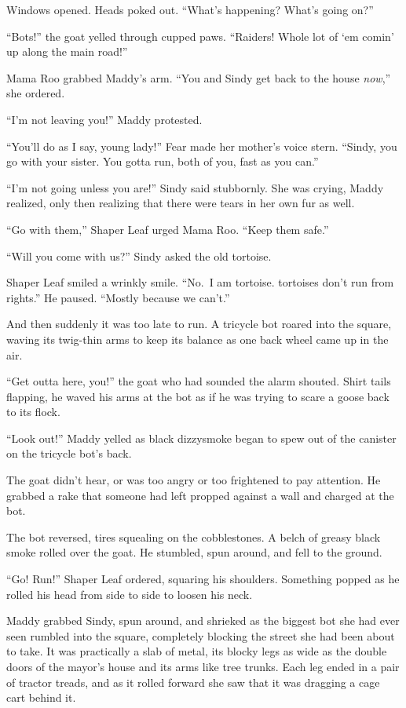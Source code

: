 \documentclass[10pt]{article}
\begin{document}
Windows opened. Heads poked out. ``What's happening? What's going on?''

``Bots!'' the goat yelled through cupped paws. ``Raiders! Whole lot of
`em comin' up along the main road!''

Mama Roo grabbed Maddy's arm. ``You and Sindy get back to the house
\emph{now},'' she ordered.

``I'm not leaving you!'' Maddy protested.

``You'll do as I say, young lady!'' Fear made her mother's voice stern.
``Sindy, you go with your sister. You gotta run, both of you, fast as
you can.''

``I'm not going unless you are!'' Sindy said stubbornly. She was crying,
Maddy realized, only then realizing that there were tears in her own fur
as well.

``Go with them,'' Shaper Leaf urged Mama Roo. ``Keep them safe.''

``Will you come with us?'' Sindy asked the old tortoise.

Shaper Leaf smiled a wrinkly smile. ``No.~I am tortoise. tortoises don't
run from rights.'' He paused. ``Mostly because we can't.''

And then suddenly it was too late to run. A tricycle bot roared into the
square, waving its twig-thin arms to keep its balance as one back wheel
came up in the air.

``Get outta here, you!'' the goat who had sounded the alarm shouted.
Shirt tails flapping, he waved his arms at the bot as if he was trying
to scare a goose back to its flock.

``Look out!'' Maddy yelled as black dizzysmoke began to spew out of the
canister on the tricycle bot's back.

The goat didn't hear, or was too angry or too frightened to pay
attention. He grabbed a rake that someone had left propped against a
wall and charged at the bot.

The bot reversed, tires squealing on the cobblestones. A belch of greasy
black smoke rolled over the goat. He stumbled, spun around, and fell to
the ground.

``Go! Run!'' Shaper Leaf ordered, squaring his shoulders. Something
popped as he rolled his head from side to side to loosen his neck.

Maddy grabbed Sindy, spun around, and shrieked as the biggest bot she
had ever seen rumbled into the square, completely blocking the street
she had been about to take. It was practically a slab of metal, its
blocky legs as wide as the double doors of the mayor's house and its
arms like tree trunks. Each leg ended in a pair of tractor treads, and
as it rolled forward she saw that it was dragging a cage cart behind it.
\end{document}
